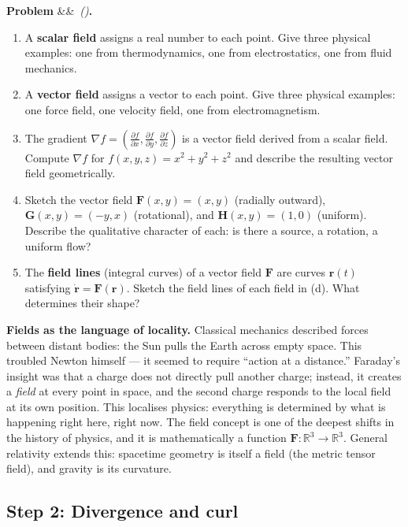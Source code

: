 \documentclass[12pt,a4paper]{article}
\newcounter{problem}
\newenvironment{problem}[1][]{\refstepcounter{problem}\par\vspace{6pt}\noindent\textbf{\color{MidBlue}Problem \theproblem}\ifx&#1&\else\ \textit{(#1)}\fi\textbf{.}\enskip}{\par\vspace{4pt}}
\begin{document}
\begin{problem}
\label{prob:fields_intro}
\begin{enumerate}[label=(\alph*),topsep=2pt]
  \item A \textbf{scalar field} assigns a real number to each point. Give three physical examples: one from thermodynamics, one from electrostatics, one from fluid mechanics.
  \item A \textbf{vector field} assigns a vector to each point. Give three physical examples: one force field, one velocity field, one from electromagnetism.
  \item The gradient $\nabla f = \left(\frac{\partial f}{\partial x}, \frac{\partial f}{\partial y}, \frac{\partial f}{\partial z}\right)$ is a vector field derived from a scalar field. Compute $\nabla f$ for $f(x,y,z) = x^2+y^2+z^2$ and describe the resulting vector field geometrically.
  \item Sketch the vector field $\mathbf{F}(x,y) = (x,y)$ (radially outward), $\mathbf{G}(x,y) = (-y,x)$ (rotational), and $\mathbf{H}(x,y) = (1,0)$ (uniform). Describe the qualitative character of each: is there a source, a rotation, a uniform flow?
  \item The \textbf{field lines} (integral curves) of a vector field $\mathbf{F}$ are curves $\mathbf{r}(t)$ satisfying $\dot{\mathbf{r}} = \mathbf{F}(\mathbf{r})$. Sketch the field lines of each field in (d). What determines their shape?
\end{enumerate}
\end{problem}

\begin{thought}
\textbf{Fields as the language of locality.}
Classical mechanics described forces between distant bodies: the Sun pulls the Earth across empty space. This troubled Newton himself --- it seemed to require ``action at a distance.'' Faraday's insight was that a charge does not directly pull another charge; instead, it creates a \emph{field} at every point in space, and the second charge responds to the local field at its own position. This localises physics: everything is determined by what is happening right here, right now. The field concept is one of the deepest shifts in the history of physics, and it is mathematically a function $\mathbf{F}:\mathbb{R}^3\to\mathbb{R}^3$. General relativity extends this: spacetime geometry is itself a field (the metric tensor field), and gravity is its curvature.
\end{thought}

\subsection{Step 2: Divergence and curl}
\end{document}
